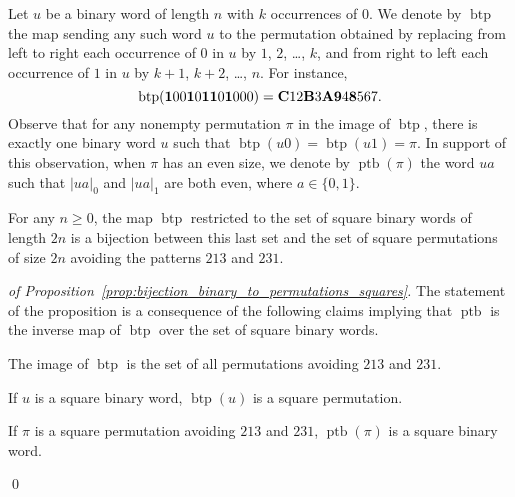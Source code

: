 \documentclass[a4paper]{llncs}
\DeclareMathOperator{\BINTOPERM}{\mathrm{btp}}
\DeclareMathOperator{\PERMTOBIN}{\mathrm{ptb}}
\begin{document}
Let $u$ be a binary word of length $n$ with $k$ occurrences of $0$.
We denote by $\BINTOPERM$ the map sending any such word $u$ to the
permutation obtained by replacing from left to right each occurrence of
$0$ in $u$ by $1$, $2$, \dots, $k$, and from right to left each
occurrence of $1$ in $u$ by $k + 1$, $k + 2$, \dots, $n$. For instance,
\begin{equation}
    \BINTOPERM({\bf 1}00{\bf 1}0{\bf 1}{\bf 1}0{\bf 1}000) =
    {\bf C} 12 {\bf B} 3 {\bf A} {\bf 9} 4 {\bf 8} 567.
\end{equation}
Observe that for any nonempty permutation $\pi$ in the image of
$\BINTOPERM$, there is exactly one binary word $u$ such that
$\BINTOPERM(u0) = \BINTOPERM(u1) = \pi$. In support of this observation,
when $\pi$ has an even size, we denote by $\PERMTOBIN(\pi)$ the word $ua$
such that $|ua|_0$ and $|ua|_1$ are both even, where $a \in \{0, 1\}$.

\begin{proposition} \label{prop:bijection_binary_to_permutations_squares}
    For any $n \geq 0$, the map $\BINTOPERM$ restricted to the set of
    square binary words of length $2n$ is a bijection between this last
    set and the set of square permutations of size $2n$ avoiding the
    patterns $213$ and $231$.
\end{proposition}
\begin{proof}
    [of Proposition~\ref{prop:bijection_binary_to_permutations_squares}]
    The statement of the proposition is a consequence of the
    following claims implying that $\PERMTOBIN$ is the inverse
    map of $\BINTOPERM$ over the set of square binary words.
    \begin{claim} \label{claim:binary_to_permutation_avoiding}
        The image of $\BINTOPERM$ is the set of all permutations
        avoiding $213$ and $231$.
    \end{claim}

    \begin{claim} \label{claim:square_binary_to_square_permutation}
        If $u$ is a square binary word, $\BINTOPERM(u)$ is a square
        permutation.
    \end{claim}

    \begin{claim} \label{claim:square_permutation_to_square_binary}
        If $\pi$ is a square permutation avoiding $213$ and $231$,
        $\PERMTOBIN(\pi)$ is a square binary word.
    \end{claim}
    \qed
\end{proof}
\end{document}
